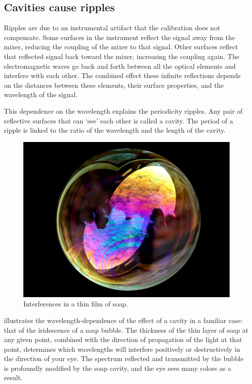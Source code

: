 \subsection{Cavities cause ripples}
Ripples are due to an instrumental artifact that the calibration does not compensate.
Some surfaces in the instrument reflect the signal away from the mixer, reducing the coupling of the mixer to that signal.
Other surfaces reflect that reflected signal back toward the mixer, increasing the coupling again.
The electromagnetic waves go back and forth between all the optical elements and interfere with each other.
The combined effect these infinite reflections depends on the distances between these elements, their surface properties, and the wavelength of the signal.

This dependence on the wavelength explains the periodicity ripples.
Any pair of reflective surfaces that can `see' each other is called a cavity.
The period of a ripple is linked to the ratio of the wavelength and the length of the cavity.

\begin{figure}[hbtp]
    \centering
    \includegraphics[width=.8\textwidth]{soap_bubble_sky}
    \caption{Interferences in a thin film of soap.}
    \label{fig:soap_bubble}
\end{figure}

 illustrates the wavelength-dependence of the effect of a cavity in a familiar case: that of the iridescence of a soap bubble.
The thickness of the thin layer of soap at any given point, combined with the direction of propagation of the light at that point, determines which wavelengths will interfere positively or destructively in the direction of your eye.
The spectrum reflected and transmitted by the bubble is profoundly modified by the soap cavity, and the eye sees many colors as a result.


